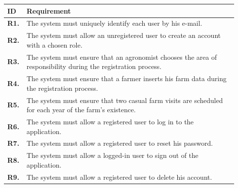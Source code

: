 \begin{longtable}{@{}p{0.06\linewidth} p{0.88\linewidth}}
		\toprule
		\textbf{ID}   & \textbf{Requirement}\\
		\midrule
		
		\textbf{R1.} & The system must uniquely identify each user by his e-mail. \\
		\textbf{R2.} & The system must allow an unregistered user to create an account with a chosen role. \\
		\textbf{R3.} & The system must ensure that an agronomist chooses the area of responsibility during the registration process. \\
		\textbf{R4.} & The system must ensure that a farmer inserts his farm data during the registration process.\\
		\textbf{R5.} & The system must ensure that two casual farm visits are scheduled for each year of the farm's existence.\\
		\textbf{R6.} & The system must allow a registered user to log in to the application. \\
		\textbf{R7.} & The system must allow a registered user to reset his password. \\
		\textbf{R8.} & The system must allow a logged-in user to sign out of the application. \\
		\textbf{R9.} & The system must allow a registered user to delete his account. \\
		

\end{longtable}
